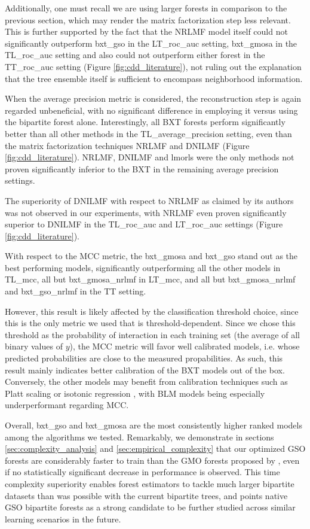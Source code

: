 Additionally, one must recall we are using larger forests in comparison to the previous section, which may render the matrix factorization step less relevant.
This is further supported by the fact that the NRLMF model itself could not significantly outperform bxt\_gso in the LT\_roc\_auc setting, bxt\_gmosa in the TL\_roc\_auc setting and also could not outperform either forest in the TT\_roc\_auc setting (Figure \ref{fig:cdd_literature}), not ruling out the explanation that the tree ensemble itself is sufficient to encompass neighborhood information.

When the average precision metric is considered, the reconstruction step is again regarded unbeneficial, with no significant difference in employing it versus using the bipartite forest alone. Interestingly, all BXT forests perform significantly better than all other methods in the TL\_average\_precision setting, even than the matrix factorization techniques NRLMF and DNILMF (Figure \ref{fig:cdd_literature}). NRLMF, DNILMF and lmorls were the only methods not proven significantly inferior to the BXT in the remaining average precision settings. 

The superiority of DNILMF with respect to NRLMF as claimed by its authors \cite{} was not observed in our experiments, with NRLMF even proven significantly superior to DNILMF in the TL\_roc\_auc and LT\_roc\_auc settings (Figure \ref{fig:cdd_literature}).

With respect to the MCC metric, the bxt\_gmosa and bxt\_gso stand out as the best performing models, significantly outperforming all the other models in TL\_mcc, all but bxt\_gmosa\_nrlmf in LT\_mcc, and all but bxt\_gmosa\_nrlmf and bxt\_gso\_nrlmf in the TT setting.

However, this result is likely affected by the classification threshold choice, since this is the only metric we used that is threshold-dependent. Since we chose this threshold as the probability of interaction in each training set (the average of all binary values of $y$), the MCC metric will favor well calibrated models, i.e. whose predicted probabilities are close to the measured propabilities.  %
As such, this result mainly indicates better calibration of the BXT models out of the box. Conversely, the other models may benefit from calibration techniques such as Platt scaling \cite{} or isotonic regression \cite{}, with BLM models being especially underperformant regarding MCC.

Overall, bxt\_gso and bxt\_gmosa are the most consistently higher ranked models among the algorithms we tested. Remarkably, we demonstrate in sections \ref{sec:complexity_analysis} and \ref{sec:empirical_complexity} that our optimized GSO forests are considerably faster to train than the GMO forests proposed by \cite{Pliakos_2018}, even if no statistically significant decrease in performance is observed. This time complexity superiority enables forest estimators to tackle much larger bipartite datasets than was possible with the current bipartite trees, and points native GSO bipartite forests as a strong candidate to be further studied across similar learning scenarios in the future.

